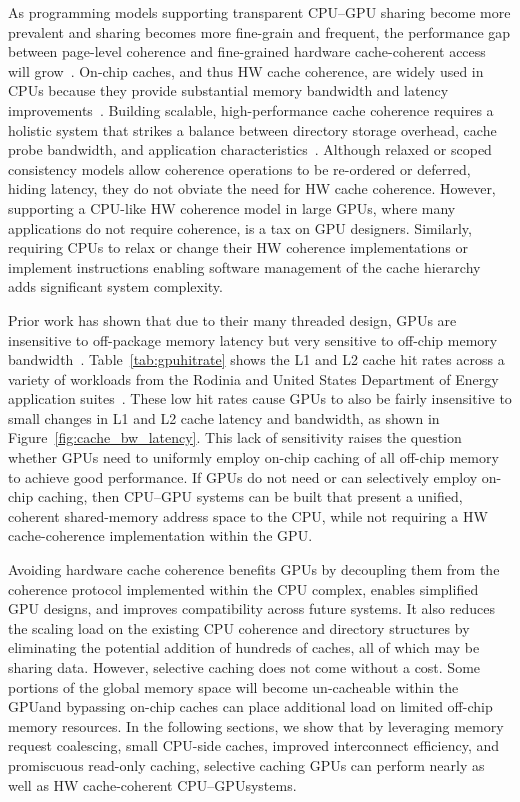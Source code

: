 As programming models supporting transparent CPU--GPU sharing become 
more prevalent and sharing becomes more fine-grain and frequent, the 
performance gap between page-level coherence and fine-grained hardware cache-coherent
access will grow~\cite{Agarwal2015,Agarwal2015b,Lim2012}. 
On-chip caches, and thus HW cache coherence, are widely used in CPUs because they 
provide substantial memory bandwidth and latency 
improvements~\cite{Martin2012}.
Building scalable, high-performance cache coherence requires 
a holistic system that strikes a balance between directory storage 
overhead, cache probe bandwidth, and application 
characteristics~\cite{Power2013,Pugsley2010,Cantin2005,johnson2011,Hong2012,Sanchez2012,Kelm2010}.
Although relaxed or scoped consistency models allow coherence operations
to be re-ordered or deferred, hiding latency, they do not obviate the need 
for HW cache coherence. However, supporting a CPU-like HW coherence model
in large GPUs, where many applications do not require coherence, is a tax on GPU designers.  Similarly,
requiring CPUs to relax or change their HW coherence implementations or implement instructions
enabling software management of the cache hierarchy adds significant system complexity.

Prior work has shown that due to their many threaded design, GPUs are 
insensitive to off-package memory latency but very sensitive to off-chip memory 
bandwidth~\cite{Agarwal2015,Agarwal2015b}. Table~\ref{tab:gpuhitrate}
shows the L1 and L2 cache hit rates across a variety of workloads from the Rodinia 
and United States Department of Energy application suites~\cite{Che2009,villa2014}.  These low hit 
rates cause GPUs to also be fairly
insensitive to small changes in L1 and L2 cache latency and bandwidth, as shown in 
Figure~\ref{fig:cache_bw_latency}.  This lack of sensitivity raises the question whether GPUs need 
to uniformly employ on-chip caching of all off-chip memory to achieve good performance.  If GPUs do not 
need or can selectively employ on-chip caching, then CPU--GPU systems can be built that
present a unified, coherent shared-memory address space to the CPU, while not requiring a 
HW cache-coherence implementation within the GPU. 

Avoiding hardware cache coherence benefits GPUs by decoupling them from the coherence protocol 
implemented within the CPU complex, enables simplified GPU designs, and improves
compatibility across future systems. It also reduces the scaling load on the 
existing CPU coherence and directory structures by eliminating the potential addition
of hundreds of caches, all of which may be sharing data. However, selective caching does not come without
a cost. Some portions of the global memory space will become un-cacheable
within the GPU\@ and bypassing on-chip caches can place additional load 
on limited off-chip memory resources.  In the following sections, we show that by leveraging
memory request coalescing, small CPU-side caches, improved interconnect efficiency, and
promiscuous read-only caching, selective caching GPUs can perform nearly as well
as HW cache-coherent CPU--GPU\@ systems.
